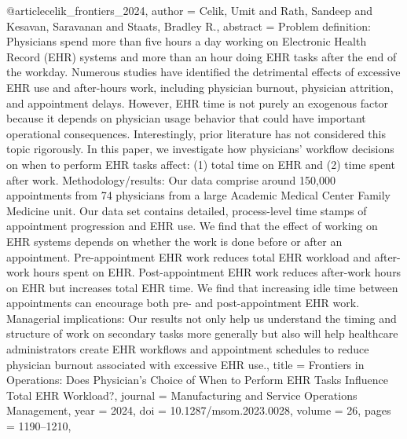 @article{celik_frontiers_2024,
  author = {Celik, Umit and Rath, Sandeep and Kesavan, Saravanan and Staats, Bradley R.},
  abstract = {Problem definition: Physicians spend more than five hours a day working on Electronic Health Record (EHR) systems and more than an hour doing EHR tasks after the end of the workday. Numerous studies have identified the detrimental effects of excessive EHR use and after-hours work, including physician burnout, physician attrition, and appointment delays. However, EHR time is not purely an exogenous factor because it depends on physician usage behavior that could have important operational consequences. Interestingly, prior literature has not considered this topic rigorously. In this paper, we investigate how physicians’ workflow decisions on when to perform EHR tasks affect: (1) total time on EHR and (2) time spent after work. Methodology/results: Our data comprise around 150,000 appointments from 74 physicians from a large Academic Medical Center Family Medicine unit. Our data set contains detailed, process-level time stamps of appointment progression and EHR use. We find that the effect of working on EHR systems depends on whether the work is done before or after an appointment. Pre-appointment EHR work reduces total EHR workload and after-work hours spent on EHR. Post-appointment EHR work reduces after-work hours on EHR but increases total EHR time. We find that increasing idle time between appointments can encourage both pre- and post-appointment EHR work. Managerial implications: Our results not only help us understand the timing and structure of work on secondary tasks more generally but also will help healthcare administrators create EHR workflows and appointment schedules to reduce physician burnout associated with excessive EHR use.},
  title = {{Frontiers} {in} {Operations}: {Does} {Physician’s} {Choice} {of} {When} {to} {Perform} {EHR} {Tasks} {Influence} {Total} {EHR} {Workload}?},
  journal = {Manufacturing and Service Operations Management},
  year = {2024},
  doi = {10.1287/msom.2023.0028},
  volume = {26},
  pages = {1190--1210},
}


